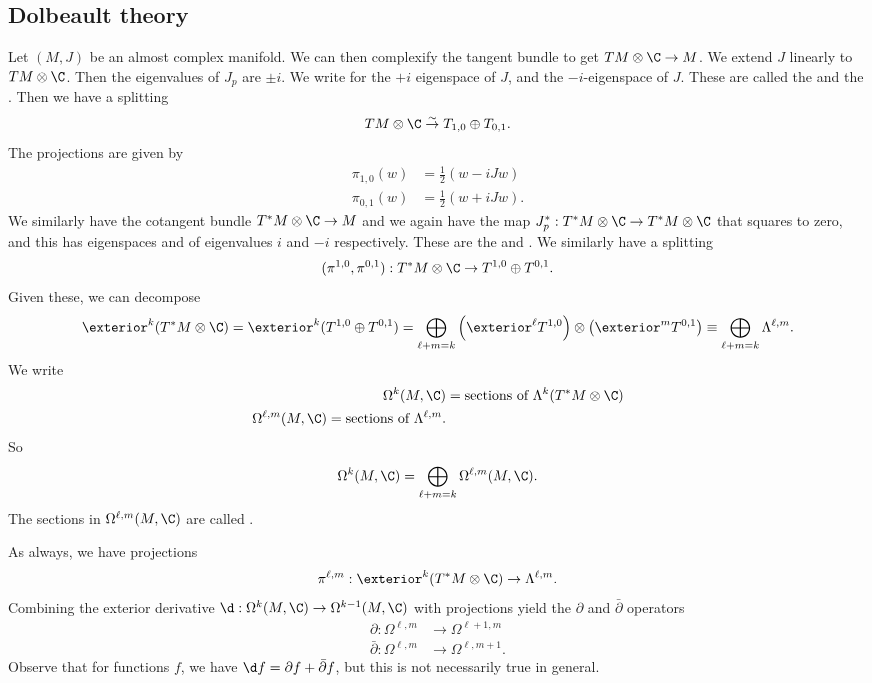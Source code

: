 \documentclass[a4paper]{article}
\begin{document}
\subsection{Dolbeault theory}
Let $(M, J)$ be an almost complex manifold. We can then complexify the tangent bundle to get $TM \otimes \C \to M$. We extend $J$ linearly to $TM \otimes \C$. Then the eigenvalues of $J_p$ are $\pm i$. We write  for the $+i$ eigenspace of $J$, and  the $-i$-eigenspace of $J$. These are called the  and the . Then we have a splitting
\[
  TM \otimes \C \overset{\sim}{\to} T_{1, 0} \oplus T_{0, 1}.
\]
The projections are given by
\begin{align*}
  \pi_{1, 0} (w) &= \frac{1}{2} (w - i J w)\\
  \pi_{0, 1} (w) &= \frac{1}{2} (w + i J w).
\end{align*}
We similarly have the cotangent bundle $T^*M \otimes \C \to M$ and we again have the map $J_p^*: T^*M \otimes \C \to T^*M \otimes \C$ that squares to zero, and this has eigenspaces  and  of eigenvalues $i$ and $-i$ respectively. These are the  and . We similarly have a splitting
\[
  (\pi^{1, 0}, \pi^{0, 1}): T^*M \otimes \C \to T^{1, 0} \oplus T^{0, 1}.
\]
Given these, we can decompose
\[
  \exterior^k (T^* M \otimes \C) = \exterior^k (T^{1, 0} \oplus T^{0, 1}) = \bigoplus_{\ell + m = k} \left(\exterior^\ell T^{1, 0}\right) \otimes \left(\exterior^m T^{0, 1}\right) \equiv \bigoplus_{\ell + m = k} \Lambda^{\ell, m}.
\]
We write
\begin{align*}
  \Omega^k (M, \C) &= \text{sections of }\Lambda^k (T^* M \otimes \C)\\
  \Omega^{\ell, m}(M, \C) = \text{sections of }\Lambda^{\ell, m}.
\end{align*}
So
\[
  \Omega^k(M, \C) = \bigoplus_{\ell + m = k} \Omega^{\ell, m} (M, \C).
\]
The sections in $\Omega^{\ell, m}(M, \C)$ are called .

As always, we have projections
\[
  \pi^{\ell, m}: \exterior^k (T^*M \otimes \C ) \to \Lambda^{\ell, m}.
\]
Combining the exterior derivative $\d: \Omega^k(M, \C) \to \Omega^{k - 1}(M, \C)$ with projections yield the $\partial$ and $\bar{\partial}$ operators
\begin{align*}
  \partial: \Omega^{\ell, m} &\to \Omega^{\ell + 1, m}\\
  \bar{\partial}: \Omega^{\ell, m} &\to \Omega^{\ell, m + 1}.
\end{align*}
Observe that for functions $f$, we have $\d f = \partial f + \bar{\partial} f$, but this is not necessarily true in general.
\end{document}
